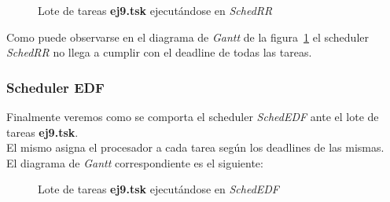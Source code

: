 \begin{figure}[H]
\centering
{}%
\caption{Lote de tareas \textbf{ej9.tsk} ejecutándose en \textit{SchedRR}}
\label{ej9-rr-gantt}
\end{figure}

Como puede observarse en el diagrama de \textit{Gantt} de la figura~\ref{ej9-rr-gantt} el scheduler \textit{SchedRR} no llega a cumplir con el deadline de todas las tareas.\\

\subsubsection{Scheduler EDF}

Finalmente veremos como se comporta el scheduler \textit{SchedEDF} ante el lote de tareas \textbf{ej9.tsk}.\\ 
El mismo asigna el procesador a cada tarea según los deadlines de las mismas.\\
El diagrama de \textit{Gantt} correspondiente es el siguiente:

\begin{figure}[H]
\centering
{}%
\caption{Lote de tareas \textbf{ej9.tsk} ejecutándose en \textit{SchedEDF}}
\label{ej9-edf-gantt}
\end{figure}

